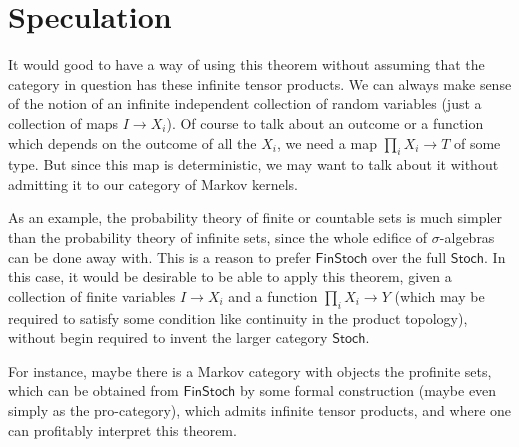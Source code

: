 \documentclass{article}
\renewcommand{\sf}{\mathsf}
\begin{document}
\section{Speculation}
It would good to have a way of using this theorem without assuming that the category in question has these infinite tensor products.
We can always make sense of the notion of an infinite independent collection of random variables (just a collection of maps $I \to X_i$).
Of course to talk about an outcome or a function which depends on the outcome of all the $X_i$, we need a map $\prod_i X_i \to T$ of some type.
But since this map is deterministic, we may want to talk about it without admitting it to our category of Markov kernels.

As an example, the probability theory of finite or countable sets is much simpler than the probability theory of infinite sets, since the whole edifice of $\sigma$-algebras can be done away with.
This is a reason to prefer $\sf{FinStoch}$ over the full $\sf{Stoch}$.
In this case, it would be desirable to be able to apply this theorem, given a collection of finite variables $I \to X_i$ and a function $\prod_i X_i \to Y$
(which may be required to satisfy some condition like continuity in the product topology), without begin required to invent the larger category $\sf{Stoch}$.

For instance, maybe there is a Markov category with objects the profinite sets, which can be obtained from $\sf{FinStoch}$ by some formal construction (maybe even simply as the pro-category), which admits infinite tensor products, and where one can profitably interpret this theorem.
\end{document}
